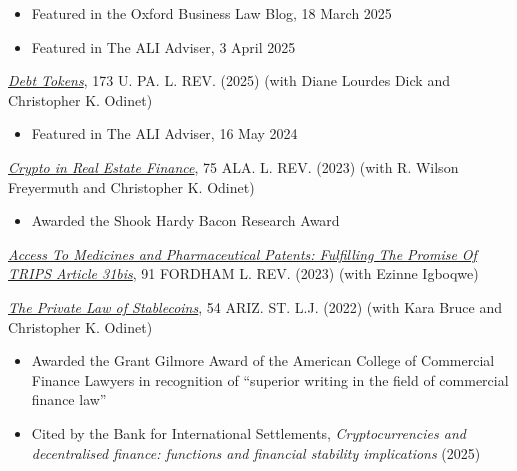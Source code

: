 \documentclass[
  11pt,
  letterpaper]{article}
\begin{document}
\begin{itemize}
\item Featured in the Oxford Business Law Blog, 18 March 2025
\item Featured in The ALI Adviser, 3 April 2025
\end{itemize}

\vspace{0.5em}\noindent\href{https://www.andreatosato.com/articles/debt-tokens}{\textit{Debt Tokens}},
173 {\fontsize{9.5}{11}\selectfont\MakeUppercase{U. Pa. L. Rev.}} (2025)
(with Diane Lourdes Dick and Christopher K. Odinet)

\begin{itemize}
\item Featured in The ALI Adviser, 16 May 2024
\end{itemize}

\vspace{0.5em}\noindent\href{https://www.andreatosato.com/articles/crypto-real-estate-finance}{\textit{Crypto in Real Estate Finance}},
75 {\fontsize{9.5}{11}\selectfont\MakeUppercase{Ala. L. Rev.}} (2023)
(with R. Wilson Freyermuth and Christopher K. Odinet)

\begin{itemize}
\item Awarded the Shook Hardy Bacon Research Award
\end{itemize}

\vspace{0.5em}\noindent\href{https://www.andreatosato.com/articles/access-medicines-trips}{\textit{Access To Medicines and Pharmaceutical Patents: Fulfilling The Promise Of TRIPS Article 31bis}},
91 {\fontsize{9.5}{11}\selectfont\MakeUppercase{Fordham L. Rev.}} (2023)
(with Ezinne Igboqwe)

\vspace{0.5em}\noindent\href{https://www.andreatosato.com/articles/private-law-stablecoins}{\textit{The Private Law of Stablecoins}},
54 {\fontsize{9.5}{11}\selectfont\MakeUppercase{Ariz. St. L.J.}} (2022)
(with Kara Bruce and Christopher K. Odinet)

\begin{itemize}
\item Awarded the Grant Gilmore Award of the American College of Commercial Finance Lawyers in recognition of ``superior writing in the field of commercial finance law''
\item Cited by the Bank for International Settlements, \textit{Cryptocurrencies and decentralised finance: functions and financial stability implications} (2025)
\end{itemize}
\end{document}
